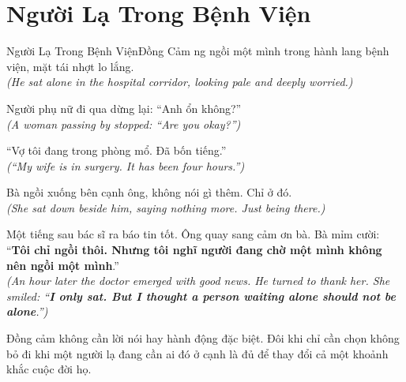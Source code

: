 \section{Người Lạ Trong Bệnh Viện}
\begin{truyen}{Người Lạ Trong Bệnh Viện}{Đồng Cảm}
ng ngồi một mình trong hành lang bệnh viện, mặt tái nhợt lo lắng.\\
\textit{(He sat alone in the hospital corridor, looking pale and deeply worried.)}

Người phụ nữ đi qua dừng lại: ``Anh ổn không?''\\
\textit{(A woman passing by stopped: ``Are you okay?'')}

``Vợ tôi đang trong phòng mổ. Đã bốn tiếng.''\\
\textit{(``My wife is in surgery. It has been four hours.'')}

Bà ngồi xuống bên cạnh ông, không nói gì thêm. Chỉ ở đó.\\
\textit{(She sat down beside him, saying nothing more. Just being there.)}

Một tiếng sau bác sĩ ra báo tin tốt. Ông quay sang cảm ơn bà. Bà mỉm cười: ``\textbf{Tôi chỉ ngồi thôi. Nhưng tôi nghĩ người đang chờ một mình không nên ngồi một mình}.''\\
\textit{(An hour later the doctor emerged with good news. He turned to thank her. She smiled: ``\textbf{I only sat. But I thought a person waiting alone should not be alone}.'')}
\end{truyen}
\begin{baihoc}
  Đồng cảm không cần lời nói hay hành động đặc biệt. Đôi khi chỉ cần chọn không bỏ đi khi một người lạ đang cần ai đó ở cạnh là đủ để thay đổi cả một khoảnh khắc cuộc đời họ.
\end{baihoc}
